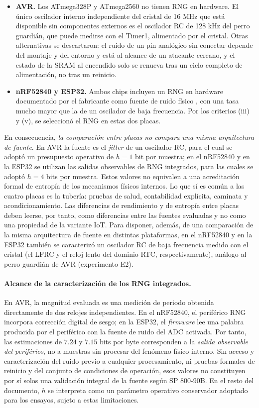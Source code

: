 \begin{itemize}
    \item \textbf{AVR.} Los ATmega328P y ATmega2560 no tienen RNG en hardware. El único oscilador interno independiente del cristal de 16 MHz que está disponible sin componentes externos es el oscilador RC de 128 kHz del perro guardián, que puede medirse con el Timer1, alimentado por el cristal. Otras alternativas se descartaron: el ruido de un pin analógico sin conectar depende del montaje y del entorno y está al alcance de un atacante cercano, y el estado de la SRAM al encendido \cite{Holcomb2009SRAM} solo se renueva tras un ciclo completo de alimentación, no tras un reinicio.
    \item \textbf{nRF52840 y ESP32.} Ambos chips incluyen un RNG en hardware documentado por el fabricante como fuente de ruido físico \cite{NordicNRF52840PS,EspressifRNG}, con una tasa mucho mayor que la de un oscilador de baja frecuencia. Por los criterios (iii) y (v), se seleccionó el RNG en estas dos placas.
\end{itemize}

En consecuencia, \emph{la comparación entre placas no compara una misma arquitectura de fuente}. En AVR la fuente es el \textit{jitter} de un oscilador RC, para el cual se adoptó un presupuesto operativo de $h=1$ bit por muestra; en el nRF52840 y en la ESP32 se utilizan las salidas observables de RNG integrados, para las cuales se adoptó $h=4$ bits por muestra. Estos valores no equivalen a una acreditación formal de entropía de los mecanismos físicos internos. Lo que sí es común a las cuatro placas es la tubería: pruebas de salud, contabilidad explícita, caminata y acondicionamiento. Las diferencias de rendimiento y de entropía entre placas deben leerse, por tanto, como diferencias entre las fuentes evaluadas y no como una propiedad de la variante IoT. Para disponer, además, de una comparación de la misma arquitectura de fuente en distintas plataformas, en el nRF52840 y en la ESP32 también se caracterizó un oscilador RC de baja frecuencia medido con el cristal (el LFRC y el reloj lento del dominio RTC, respectivamente), análogo al perro guardián de AVR (experimento E2).

\paragraph{Alcance de la caracterización de los RNG integrados.} En AVR, la magnitud evaluada es una medición de periodo obtenida directamente de dos relojes independientes. En el nRF52840, el periférico RNG incorpora corrección digital de sesgo; en la ESP32, el \textit{firmware} lee una palabra producida por el periférico con la fuente de ruido del ADC activada. Por tanto, las estimaciones de $7.24$ y $7.15$ bits por byte corresponden a la \emph{salida observable del periférico}, no a muestras sin procesar del fenómeno físico interno. Sin acceso y caracterización del ruido previo a cualquier procesamiento, ni pruebas formales de reinicio y del conjunto de condiciones de operación, esos valores no constituyen por sí solos una validación integral de la fuente según SP 800-90B. En el resto del documento, $h$ se interpreta como un parámetro operativo conservador adoptado para los ensayos, sujeto a estas limitaciones.


